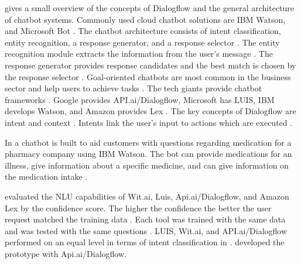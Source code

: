 \citet{rahman2017programming} gives a small overview of the concepts of Dialogflow and the general architecture of chatbot systems.
Commonly used cloud chatbot solutions are IBM Watson, and Microsoft Bot \cite{rahman2017programming}.
The chatbot architecture consists of intent classification, entity recognition, a response generator, and a response selector \cite{rahman2017programming}. 
The entity recognition module extracts the information from the user's message \cite{rahman2017programming}.
The response generator provides response candidates and the best match is chosen by the response selector \cite{rahman2017programming}.
Goal-oriented chatbots are most common in the business sector and help users to achieve tasks \cite{rahman2017programming}.
The tech giants provide chatbot frameworks \cite{rahman2017programming}.
Google provides API.ai/Dialogflow, Microsoft has LUIS, IBM develops Watson, and Amazon provides Lex \cite{rahman2017programming}.
The key concepts of Dialogflow are intent and context \cite{rahman2017programming}.
Intents link the user's input to actions which are executed \cite{rahman2017programming}.

In \citet{pharmacybot} a chatbot is built to aid customers with questions regarding medication for a pharmacy company using IBM Watson.
The bot can provide medications for an illness, give information about a specific medicine, and can 
give information on the medication intake \cite{pharmacybot}.

\citet{gregori2017evaluation} evaluated the NLU capabilities of Wit.ai, Luis, Api.ai/Dialogflow, and Amazon Lex
by the confidence score. The higher the confidence the better the user request matched the training data \citet{gregori2017evaluation}.
Each tool was trained with the same data and was tested with the same questions \citet{gregori2017evaluation}.
LUIS, Wit.ai, and API.ai/Dialogflow performed on an equal level in terms of intent classification in \citet{gregori2017evaluation}.
\citet{gregori2017evaluation} developed the prototype with Api.ai/Dialogflow.

